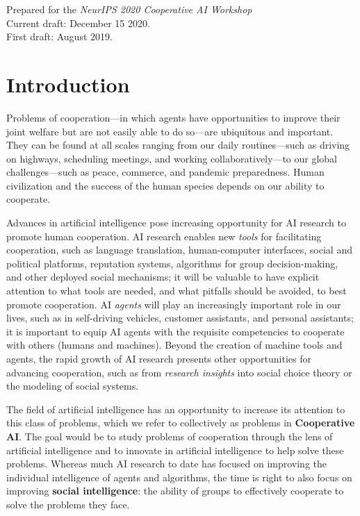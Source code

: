 \documentclass[11pt, a4paper, logo, onecolumn, nonumbering]{deepmind}
\begin{document}
\maketitle 

\vspace{15mm}
\noindent Prepared for the \textit{NeurIPS 2020 Cooperative AI Workshop}\\
Current draft: December 15 2020. \\First draft: August 2019.

\newpage
\renewcommand\cftsecafterpnum{\vskip12pt}
\tableofcontents

\newpage
\section{Introduction}


Problems of cooperation---in which agents have opportunities to improve their joint welfare but are not easily able to do so---are ubiquitous and important. 
They can be found at all scales ranging from our daily routines---such as driving on highways, scheduling meetings, and working collaboratively---to our global challenges---such as peace, commerce, and pandemic preparedness. Human civilization and the success of the human species depends on our ability to cooperate. 

Advances in artificial intelligence pose increasing opportunity for AI research to promote human cooperation. AI research enables new \textit{tools} for facilitating cooperation, such as language translation, human-computer interfaces, social and political platforms, reputation systems, algorithms for group decision-making, and other deployed social mechanisms; it will be valuable to have explicit attention to what tools are needed, and what pitfalls should be avoided, to best promote cooperation.
AI \textit{agents} will play an increasingly important role in our lives, such as in self-driving vehicles, %
customer assistants, 
and personal assistants; it is important to equip AI agents with the requisite competencies to cooperate with others (humans and machines). Beyond the creation of machine tools and agents, the rapid growth of AI research presents other opportunities for advancing cooperation, such as from \textit{research insights} into social choice theory or the modeling of social systems.


The field of artificial intelligence has an opportunity to increase its attention to this class of problems, which we refer to collectively as problems in \textbf{Cooperative AI}. The goal would be to study problems of cooperation through the lens of artificial intelligence and to innovate in artificial intelligence to help solve these problems. Whereas much AI research to date has focused on improving the individual intelligence of agents and algorithms,
the time is right to also focus on improving \textbf{social intelligence}: the ability of groups to effectively cooperate to solve the problems they face. 
\end{document}
